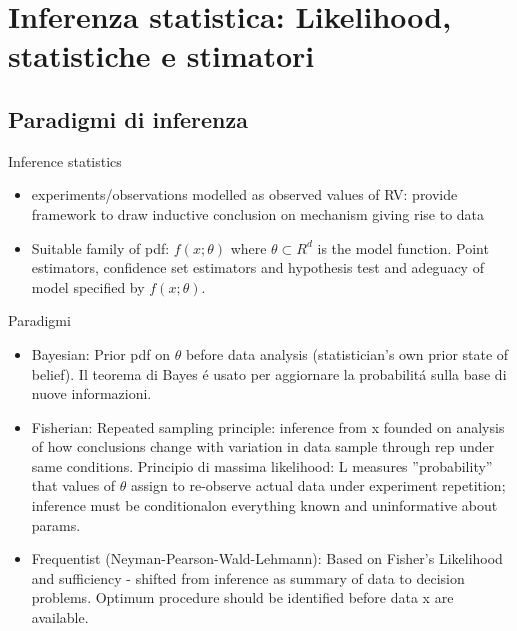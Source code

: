 \documentclass[asd-beamer.tex]{subfiles}
\begin{document}
\section{Inferenza statistica: Likelihood, statistiche e stimatori}


\subsection{Paradigmi di inferenza}

\begin{frame}{Inference statistics}
\begin{itemize}
\item experiments/observations modelled as observed values of RV: provide framework to draw inductive conclusion on mechanism giving rise to data
\item Suitable family of pdf: $f(x;\theta)$ where $\theta\subset R^d$ is the model function. Point estimators, confidence set estimators and hypothesis test and adeguacy of model specified by $f(x;\theta)$.
\end{itemize}
\end{frame}

\begin{frame}{Paradigmi}
\begin{itemize}
\item Bayesian: Prior pdf on $\theta$ before data analysis (statistician's own prior state of belief). Il teorema di Bayes \'e usato per aggiornare la probabilit\'a sulla base di nuove informazioni.
\item Fisherian: Repeated sampling principle: inference from x founded on analysis of how conclusions change with variation in data sample through rep under same conditions. Principio di massima likelihood: L measures ''probability'' that values of $\theta$ assign to re-observe actual data under experiment repetition; inference must be conditionalon everything known and uninformative about params.
\item Frequentist (Neyman-Pearson-Wald-Lehmann): Based on Fisher's Likelihood and sufficiency - shifted from inference as summary of data to decision problems. Optimum procedure should be identified before data x are available.
\end{itemize}

\end{frame}
\end{document}
